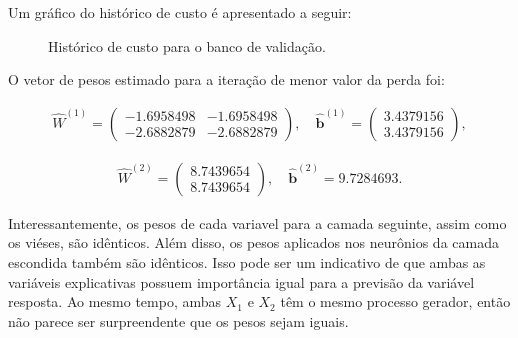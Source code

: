 \documentclass[
  a4paperpaper,
]{article}
\begin{document}
Um gráfico do histórico de custo é apresentado a seguir:

\begin{figure}[H]


\caption{\label{fig-historico-custo}Histórico de custo para o banco de
validação.}

\end{figure}%

O vetor de pesos estimado para a iteração de menor valor da perda foi:

\begin{align*}
\hat{W}^{(1)} = \begin{pmatrix} -1.6958498 & -1.6958498 \\ -2.6882879 & -2.6882879 \end{pmatrix}, \quad 
%
\hat{\boldsymbol{b}}^{(1)} = \begin{pmatrix} 3.4379156 \\ 3.4379156 \end{pmatrix},
\end{align*}

\begin{align*}
\hat{W}^{(2)} = \begin{pmatrix} 8.7439654 \\ 8.7439654 \end{pmatrix}, \quad 
%
\hat{\boldsymbol{b}}^{(2)} = 9.7284693.
\end{align*}

Interessantemente, os pesos de cada variavel para a camada seguinte,
assim como os viéses, são idênticos. Além disso, os pesos aplicados nos
neurônios da camada escondida também são idênticos. Isso pode ser um
indicativo de que ambas as variáveis explicativas possuem importância
igual para a previsão da variável resposta. Ao mesmo tempo, ambas
\(X_1\) e \(X_2\) têm o mesmo processo gerador, então não parece ser
surpreendente que os pesos sejam iguais.
\end{document}
